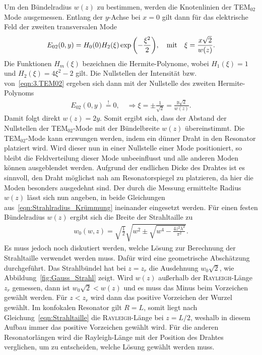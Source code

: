 \documentclass[a4paper,twoside,final]{article}
\begin{document}
Um den Bündelradius $w(z)$ zu bestimmen, werden die Knotenlinien der TEM$_{02}$ Mode ausgemessen. Entlang der $y$-Achse bei $x=0$ gilt dann für das elektrische Feld der zweiten transversalen Mode~\cite{Eichler}
\begin{align}\label{eqn:3.TEM02}
  E_{02}(0,y) = H_0(0) H_2(\xi) \exp\qty(-\frac{\xi^2}{2}), \quad \text{mit} \quad \xi = \frac{x\sqrt{2}}{w(z)}.
\end{align}
Die Funktionen $H_m(\xi)$ bezeichnen die Hermite-Polynome, wobei $H_1(\xi) = 1$ und $H_2(\xi) = 4\xi^2- 2$ gilt. Die Nullstellen der Intensität bzw. von~\eqref{eqn:3.TEM02} ergeben sich dann mit der Nullstelle des zweiten Hermite-Polynoms
\begin{align}
  E_{02}(0,y) \overset{!}{=} 0, \quad \Rightarrow \xi = \pm \frac{1}{\sqrt{2}} = \frac{y \sqrt{2}}{w(z)}.
\end{align}
Damit folgt direkt $w(z) = 2y$. Somit ergibt sich, dass der Abstand der Nullstellen der TEM$_{02}$-Mode mit der Bündelbreite $w(z)$ übereinstimmt. Die TEM$_{02}$-Mode kann erzwungen werden, indem ein dünner Draht in den Resonator platziert wird. Wird dieser nun in einer Nullstelle einer Mode positioniert, so bleibt die Feldverteilung dieser Mode unbeeinflusst und alle anderen Moden können ausgeblendet werden. Aufgrund der endlichen Dicke des Drahtes ist es sinnvoll, den Draht möglichst nah am Resonatorspiegel zu platzieren, da hier die Moden besonders ausgedehnt sind. Der durch die Messung ermittelte Radius $w(z)$ lässt sich nun angeben, in beide Gleichungen aus~\eqref{eqn:Strahlradius_Krümmung} ineinander eingesetzt werden. Für einen festen Bündelradius $w(z)$ ergibt sich die Breite der Strahltaille zu~\cite{Anleitung}
\begin{align}
  w_0(w,z) = \sqrt{\frac{1}{2}} \sqrt{w^2 \pm \sqrt{w^4-\frac{4z^2 \lambda^2}{\pi^2}}}.
\end{align}
Es muss jedoch noch diskutiert werden, welche Lösung zur Berechnung der Strahltaille verwendet werden muss. Dafür wird eine geometrische Abschätzung durchgeführt. Das Strahlbündel hat bei $z = z_r$ die Ausdehnung $w_0 \sqrt{2}$, wie Abbildung~\ref{fig:Gauss_Strahl} zeigt. Wird $w(z)$ außerhalb der \textsc{Rayleigh}-Länge $z_r$ gemessen, dann ist $w_0 \sqrt{2} < w(z)$ und es muss das Minus beim Vorzeichen gewählt werden. Für $z < z_r$ wird dann das positive Vorzeichen der Wurzel gewählt. Im konfokalen Resonator gilt $R=L$, somit liegt nach Gleichung~\eqref{eqn:Strahltaille} die \textsc{Rayleigh}-Länge bei $z = L/2$, weshalb in diesem Aufbau immer das positive Vorzeichen gewählt wird. Für die anderen Resonatorlängen wird die Rayleigh-Länge mit der Position des Drahtes verglichen, um zu entscheiden, welche Lösung gewählt werden muss. 
\end{document}
